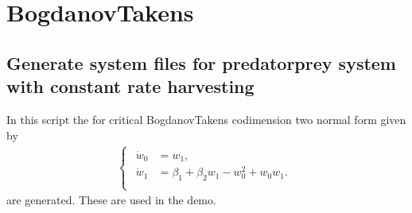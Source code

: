 \documentclass[letterpaper,10pt,english]{jupyterBook}
\begin{document}
\begin{sphinxVerbatim}[commandchars=\\\{\}]
\PYG{p}{[}\PYG{p}{]}
\PYG{p}{[}\PYG{p}{]}
\PYG{p}{[}\PYG{p}{]}
\end{sphinxVerbatim}


\part{Bogdanov\sphinxhyphen{}Takens}


\chapter{Generate system files for predator\sphinxhyphen{}prey system with constant rate harvesting}
\label{\detokenize{BogdanovTakensNormalFormGenSym:generate-system-files-for-predator-prey-system-with-constant-rate-harvesting}}\label{\detokenize{BogdanovTakensNormalFormGenSym::doc}}
\sphinxAtStartPar
In this script the  for critical Bogdanov\sphinxhyphen{}Takens codimension
two normal form given by
\begin{equation*}
\begin{split}
\begin{cases}
\begin{aligned}
\dot w_0 &= w_1, \\
\dot w_1 &= \beta_1  + \beta_2 w_1 - w_0^2 + w_0 w_1. \\
\end{aligned}
\end{cases}
\end{split}
\end{equation*}
\sphinxAtStartPar
are generated. These are used in the {\hyperref[\detokenize{BogdanovTakens::doc}]{}} demo.
\end{document}
